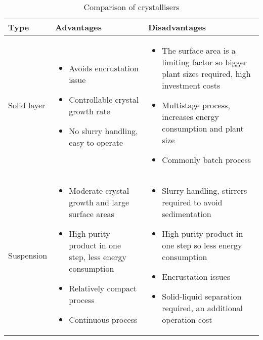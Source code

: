 \begin{table}
\caption{Comparison of crystallisers \cite{myerson_handbook_2019} }
\label{tab:crystallisertype}
\begin{tabularx}{\linewidth}{@{}lXX@{}}
\toprule
Type & Advantages                 & Disadvantages                               \\ \midrule
Solid layer & \begin{itemize}[label=+,leftmargin=1em]
  \item Avoids encrustation issue 
  \item Controllable crystal growth rate 
  \item No slurry handling, easy to operate
\end{itemize} & \begin{itemize}[label=-,leftmargin=1em]
  \item The surface area is a limiting factor so bigger plant sizes required, high investment costs
  \item Multistage process, increases energy consumption and plant size 
  \item Commonly batch process
\end{itemize} \\\midrule 
Suspension &  \begin{itemize}[label=+,leftmargin=1em]
  \item Moderate crystal growth and large surface areas 
  \item High purity product in one step, less energy consumption
  \item Relatively compact process
  \item Continuous process
\end{itemize} & \begin{itemize}[label=-,leftmargin=1em]
  \item Slurry handling, stirrers required to avoid sedimentation
  \item High purity product in one step so less energy consumption
  \item Encrustation issues 
  \item Solid-liquid separation required, an additional operation cost
\end{itemize}
\\\bottomrule
\end{tabularx}
\end{table}

